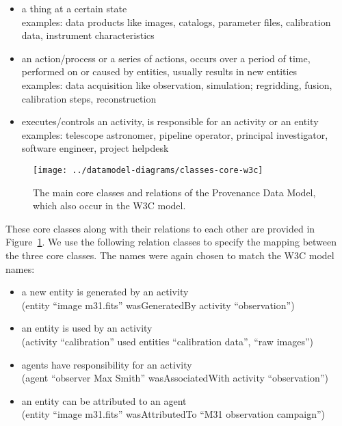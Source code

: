 \begin{itemize}
\item {} a thing at a certain state\\
    examples: data products like images, catalogs, parameter files, calibration data, instrument characteristics

\item {} an action/process or a series of actions, occurs over a period of time, performed on or caused by entities, usually results in new entities\\
    examples: data acquisition like observation, simulation; regridding, fusion, calibration steps, reconstruction

\item {} executes/controls an activity, is responsible for an activity or an entity\\
    examples: telescope astronomer, pipeline operator, principal investigator, software engineer, project helpdesk

\end{itemize}

\noindent



\begin{figure}[h]
\centering
\texttt{[image: ../datamodel-diagrams/classes-core-w3c]}
\caption{The main core classes and relations of the Provenance Data Model, which also occur in the W3C model.}
\label{fig:coreclasses}
\end{figure}

These core classes along with their relations to each other are provided in Figure~\ref{fig:coreclasses}.
We use the following relation classes to specify the mapping between the three core 
classes. The names were again chosen to match the W3C model names:
\begin{itemize}
\item {} a new entity is generated by an activity\\
        (entity ``image m31.fits'' wasGeneratedBy activity ``observation'')
\item {} an entity is used by an activity\\
        (activity ``calibration'' used entities ``calibration data'', ``raw images'')
\item {} agents have responsibility for an activity\\
        (agent ``observer Max Smith'' wasAssociatedWith activity ``observation'')
\item {} an entity can be attributed to an agent\\
		(entity ``image m31.fits'' wasAttributedTo ``M31 observation campaign'')
\end{itemize}


